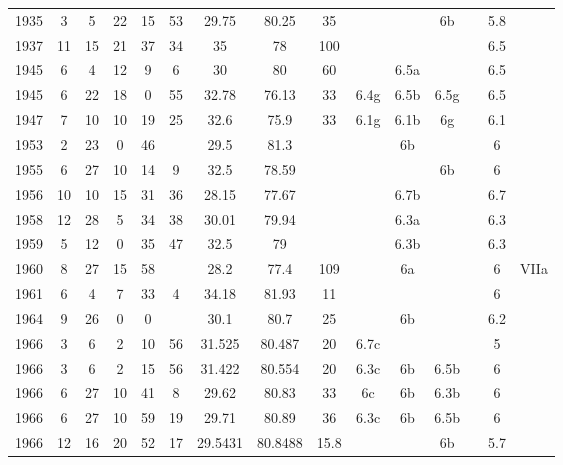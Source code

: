 \begin{flushleft}
\begin{longtable}{|c|c|c|c|c|c|c|c|c|c|c|c|c|c|c|}
1935 & 3  & 5  & 22 & 15 & 53 & 29.75   & 80.25   & 35   &       &      & 6b    &      & 5.8  &        \\
1937 & 11 & 15 & 21 & 37 & 34 & 35      & 78      & 100  &       &      &       &      & 6.5  &        \\
1945 & 6  & 4  & 12 & 9  & 6  & 30      & 80      & 60   &       & 6.5a &       &      & 6.5  &        \\
1945 & 6  & 22 & 18 & 0  & 55 & 32.78   & 76.13   & 33   & 6.4g  & 6.5b & 6.5g  &      & 6.5  &        \\
1947 & 7  & 10 & 10 & 19 & 25 & 32.6    & 75.9    & 33   & 6.1g  & 6.1b & 6g    &      & 6.1  &        \\
1953 & 2  & 23 & 0  & 46 &    & 29.5    & 81.3    &      &       & 6b   &       &      & 6    &        \\
1955 & 6  & 27 & 10 & 14 & 9  & 32.5    & 78.59   &      &       &      & 6b    &      & 6    &        \\
1956 & 10 & 10 & 15 & 31 & 36 & 28.15   & 77.67   &      &       & 6.7b &       &      & 6.7  &        \\
1958 & 12 & 28 & 5  & 34 & 38 & 30.01   & 79.94   &      &       & 6.3a &       &      & 6.3  &        \\
1959 & 5  & 12 & 0  & 35 & 47 & 32.5    & 79      &      &       & 6.3b &       &      & 6.3  &        \\
1960 & 8  & 27 & 15 & 58 &    & 28.2    & 77.4    & 109  &       & 6a   &       &      & 6    & VIIa   \\
1961 & 6  & 4  & 7  & 33 & 4  & 34.18   & 81.93   & 11   &       &      &       &      & 6    &        \\
1964 & 9  & 26 & 0  & 0  &    & 30.1    & 80.7    & 25   &       & 6b   &       &      & 6.2  &        \\
1966 & 3  & 6  & 2  & 10 & 56 & 31.525  & 80.487  & 20   & 6.7c  &      &       &      & 5    &        \\
1966 & 3  & 6  & 2  & 15 & 56 & 31.422  & 80.554  & 20   & 6.3c  & 6b   & 6.5b  &      & 6    &        \\
1966 & 6  & 27 & 10 & 41 & 8  & 29.62   & 80.83   & 33   & 6c    & 6b   & 6.3b  &      & 6    &        \\
1966 & 6  & 27 & 10 & 59 & 19 & 29.71   & 80.89   & 36   & 6.3c  & 6b   & 6.5b  &      & 6    &        \\
1966 & 12 & 16 & 20 & 52 & 17 & 29.5431 & 80.8488 & 15.8 &       &      & 6b    &      & 5.7  &        \\

\end{longtable}
\end{flushleft}
